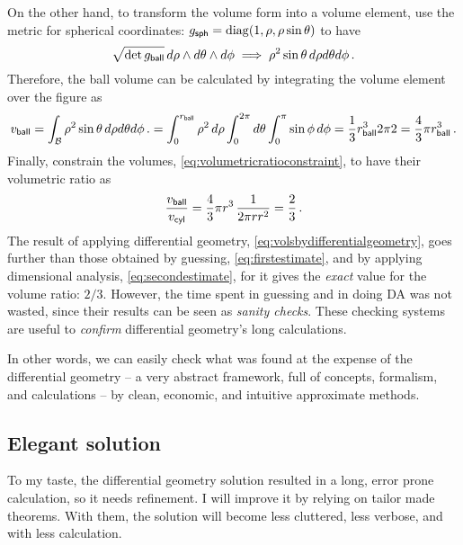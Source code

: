 On the other hand, to transform the volume form into a volume element, use the metric for spherical coordinates: $\metric\sbtxt{sph} = \diag\vat{1,\sxpos,\sxpos\sin\sypos}$ to have
%
\begin{equation*}
  \sqrt{\det g_{\text{\textsf{ball}}}}\,d\rho\wedge d\theta\wedge d\phi \implies
    \rho^2\sin\theta\,d\rho d\theta d\phi\,.
\end{equation*}
%
Therefore, the ball volume can be calculated by integrating the volume element over the figure as
%
\begin{equation*}
  v_{\text{\textsf{ball}}} = \int_{\mathcal{B}}\rho^2\sin\theta\,d\rho d\theta d\phi\,.
         = \int_{0}^{r_{\text{\textsf{ball}}}}\rho^2\,d\rho \int_{0}^{2\pi} d\theta \int_{0}^{\pi}\sin\phi\,d\phi 
         = \dfrac 13r_{\text{\textsf{ball}}}^3 2\pi 2
         = \dfrac 43\pi r_{\text{\textsf{ball}}}^3\,.
\end{equation*}
%
Finally, constrain the volumes, \cref{eq:volumetricratioconstraint}, to have their volumetric ratio as
%
\begin{equation}\label{eq:volsbydifferentialgeometry}
  \dfrac{v_{\text{\textsf{ball}}}}{v_{\text{\textsf{cyl}}}} = \dfrac 43\pi r^3\,\dfrac{1}{2\pi rr^2}
                        = \dfrac 23\,.
\end{equation}
%
 The result of applying differential geometry, \cref{eq:volsbydifferentialgeometry}, goes further than those obtained by guessing, \cref{eq:firstestimate}, and by applying dimensional analysis, \cref{eq:secondestimate}, for it gives the \emph{exact} value for the volume ratio: $2/3$. However, the time spent in guessing and in doing DA was not wasted, since their results can be seen as \emph{sanity checks}. These checking systems are useful to \emph{confirm} differential geometry's long calculations.

 In other words, we can easily check what was found at the expense of the differential geometry -- a very abstract framework, full of concepts, formalism, and calculations -- by clean, economic, and intuitive approximate methods.



\subsection{Elegant solution} %
\label{sub:elegant_solution}

 To my taste, the differential geometry solution resulted in a long, error prone calculation, so it needs refinement. I will improve it by relying on tailor made theorems. With them, the solution will become less cluttered, less verbose, and with less calculation.

